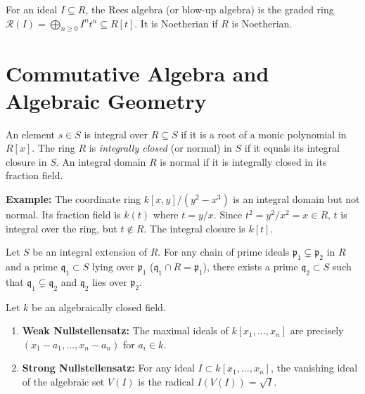 \begin{definition}
For an ideal $I \subseteq R$, the Rees algebra (or blow-up algebra) is the graded ring $\mathcal{R}(I) = \bigoplus_{n \ge 0} I^n t^n \subseteq R[t]$. It is Noetherian if $R$ is Noetherian.
\end{definition}

\section{Commutative Algebra and Algebraic Geometry}

\begin{definition}
An element $s \in S$ is integral over $R \subseteq S$ if it is a root of a monic polynomial in $R[x]$. The ring $R$ is \textit{integrally closed} (or normal) in $S$ if it equals its integral closure in $S$. An integral domain $R$ is normal if it is integrally closed in its fraction field.

\textbf{Example:} The coordinate ring $k[x,y]/(y^2 - x^3)$ is an integral domain but not normal. Its fraction field is $k(t)$ where $t = y/x$. Since $t^2 = y^2/x^2 = x \in R$, $t$ is integral over the ring, but $t \notin R$. The integral closure is $k[t]$.
\end{definition}

\begin{theorem}
Let $S$ be an integral extension of $R$. For any chain of prime ideals $\mathfrak{p}_1 \subsetneq \mathfrak{p}_2$ in $R$ and a prime $\mathfrak{q}_1 \subset S$ lying over $\mathfrak{p}_1$ ($\mathfrak{q}_1 \cap R = \mathfrak{p}_1$), there exists a prime $\mathfrak{q}_2 \subset S$ such that $\mathfrak{q}_1 \subsetneq \mathfrak{q}_2$ and $\mathfrak{q}_2$ lies over $\mathfrak{p}_2$.
\end{theorem}

\begin{theorem}
Let $k$ be an algebraically closed field. 
\begin{enumerate}
    \item \textbf{Weak Nullstellensatz:} The maximal ideals of $k[x_1, \dots, x_n]$ are precisely $(x_1-a_1, \dots, x_n-a_n)$ for $a_i \in k$.
    \item \textbf{Strong Nullstellensatz:} For any ideal $I \subset k[x_1, \dots, x_n]$, the vanishing ideal of the algebraic set $V(I)$ is the radical $I(V(I)) = \sqrt{I}$.
\end{enumerate}
\end{theorem}


